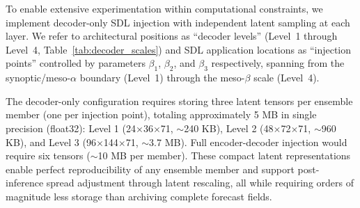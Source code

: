 \documentclass{agujournal2019}
\begin{document}

To enable extensive experimentation within computational constraints, we implement decoder-only SDL injection with independent latent sampling at each layer. We refer to architectural positions as ``decoder levels'' (Level~1 through Level~4, Table~\ref{tab:decoder_scales}) and SDL application locations as ``injection points'' controlled by parameters $\beta_1$, $\beta_2$, and $\beta_3$ respectively, spanning from the synoptic/meso-$\alpha$ boundary (Level~1) through the meso-$\beta$ scale (Level~4).

The decoder-only configuration requires storing three latent tensors per ensemble member (one per injection point), totaling approximately 5 MB in single precision (float32): Level 1 (24$\times$36$\times$71, $\sim$240 KB), Level 2 (48$\times$72$\times$71, $\sim$960 KB), and Level 3 (96$\times$144$\times$71, $\sim$3.7 MB). Full encoder-decoder injection would require six tensors ($\sim$10 MB per member). These compact latent representations enable perfect reproducibility of any ensemble member and support post-inference spread adjustment through latent rescaling, all while requiring orders of magnitude less storage than archiving complete forecast fields.
\end{document}
